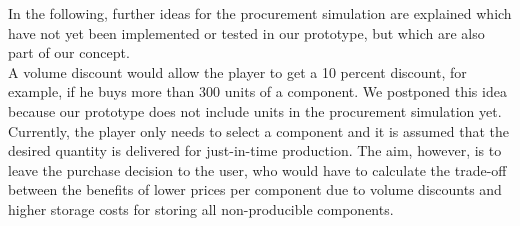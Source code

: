 In the following, further ideas for the procurement simulation are explained which have not yet been implemented or tested in our prototype, but which are also part of our concept.\\
A volume discount would allow the player to get a 10 percent discount, for example, if he buys more than 300 units of a component. We postponed this idea because our prototype does not include units in the procurement simulation yet. Currently, the player only needs to select a component and it is assumed that the desired quantity is delivered for just-in-time production. 
The aim, however, is to leave the purchase decision to the user, who would have to calculate the trade-off between the benefits of lower prices per component due to volume discounts and higher storage costs for storing all non-producible components.